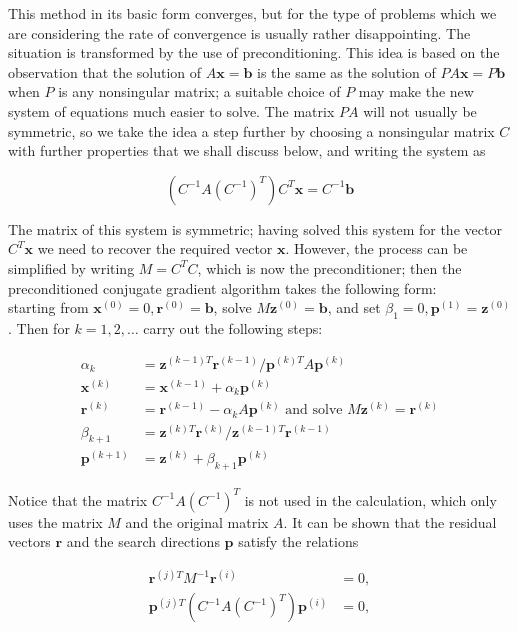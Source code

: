 \documentclass[10pt]{article}
\begin{document}
This method in its basic form converges, but for the type of problems which we are considering the rate of convergence is usually rather disappointing. The situation is transformed by the use of preconditioning. This idea is based on the observation that the solution of \(A \mathbf{x}=\mathbf{b}\) is the same as the solution of \(P A \mathbf{x}=P \mathbf{b}\) when \(P\) is any nonsingular matrix; a suitable choice of \(P\) may make the new system of equations much easier to solve. The matrix \(P A\) will not usually be symmetric, so we take the idea a step further by choosing a nonsingular matrix \(C\) with further properties that we shall discuss below, and writing the system as

\[
\left(C^{-1} A\left(C^{-1}\right)^{T}\right) C^{T} \mathbf{x}=C^{-1} \mathbf{b}
\]

The matrix of this system is symmetric; having solved this system for the vector \(C^{T} \mathbf{x}\) we need to recover the required vector \(\mathbf{x}\). However, the process can be simplified by writing \(M=C^{T} C\), which is now the preconditioner; then the preconditioned conjugate gradient algorithm takes the following form:\\
starting from \(\mathbf{x}^{(0)}=0, \mathbf{r}^{(0)}=\mathbf{b}\), solve \(M \mathbf{z}^{(0)}=\mathbf{b}\), and set \(\beta_{1}=0, \mathbf{p}^{(1)}=\mathbf{z}^{(0)}\). Then for \(k=1,2, \ldots\) carry out the following steps:

\[
\begin{aligned}
\alpha_{k} & =\mathbf{z}^{(k-1) T} \mathbf{r}^{(k-1)} / \mathbf{p}^{(k) T} A \mathbf{p}^{(k)} \\
\mathbf{x}^{(k)} & =\mathbf{x}^{(k-1)}+\alpha_{k} \mathbf{p}^{(k)} \\
\mathbf{r}^{(k)} & =\mathbf{r}^{(k-1)}-\alpha_{k} A \mathbf{p}^{(k)} \text { and solve } M \mathbf{z}^{(k)}=\mathbf{r}^{(k)} \\
\beta_{k+1} & =\mathbf{z}^{(k) T} \mathbf{r}^{(k)} / \mathbf{z}^{(k-1) T} \mathbf{r}^{(k-1)} \\
\mathbf{p}^{(k+1)} & =\mathbf{z}^{(k)}+\beta_{k+1} \mathbf{p}^{(k)}
\end{aligned}
\]

Notice that the matrix \(C^{-1} A\left(C^{-1}\right)^{T}\) is not used in the calculation, which only uses the matrix \(M\) and the original matrix \(A\). It can be shown that the residual vectors \(\mathbf{r}\) and the search directions \(\mathbf{p}\) satisfy the relations

\[
\begin{aligned}
\mathbf{r}^{(j) T} M^{-1} \mathbf{r}^{(i)} & =0, \\
\mathbf{p}^{(j) T}\left(C^{-1} A\left(C^{-1}\right)^{T}\right) \mathbf{p}^{(i)} & =0,
\end{aligned}
\]
\end{document}
